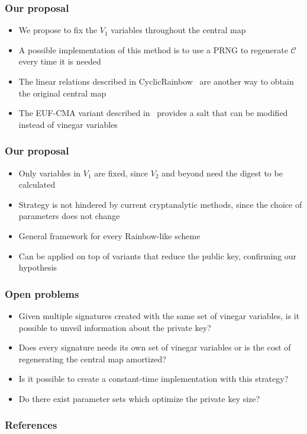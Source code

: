 \documentclass[12pt]{beamer}
\newcommand{\backupbegin}{
  \newcounter{framenumberappendix}
  \setcounter{framenumberappendix}{\value{framenumber}}
}
\newcommand{\backupend}{
  \addtocounter{framenumberappendix}{-\value{framenumber}}
  \addtocounter{framenumber}{\value{framenumberappendix}}
}
\begin{document}
\begin{frame}
  \frametitle{Our proposal}
  \begin{itemize}
    \item We propose to fix the $V_{1}$ variables throughout the central map
    \item A possible implementation of this method is to use a PRNG to
        regenerate $\mathcal{C}$ every time it is needed
    \item The linear relations described in
        CyclicRainbow~\cite{Petzoldt:inproc:2010:dec} are another way to obtain
        the original central map
    \item The EUF-CMA variant described in~\cite{Ding:misc:2017:dec} provides
        a salt that can be modified instead of vinegar variables
  \end{itemize}
\end{frame}

\begin{frame}
  \frametitle{Our proposal}
  \begin{itemize}
    \item Only variables in $V_{1}$ are fixed, since $V_{2}$ and beyond need
        the digest to be calculated
    \item Strategy is not hindered by current cryptanalytic methods, since the
        choice of parameters does not change
    \item General framework for every Rainbow-like scheme
    \item Can be applied on top of variants that reduce the public key,
        confirming our hypothesis
  \end{itemize}
\end{frame}

\begin{frame}
  \frametitle{Open problems}
  \begin{itemize}
    \item Given multiple signatures created with the same set of vinegar
        variables, is it possible to unveil information about the private key?
    \item Does every signature needs its own set of vinegar variables or is the
        cost of regenerating the central map amortized?
    \item Is it possible to create a constant-time implementation with this
        strategy?
    \item Do there exist parameter sets which optimize the private key size?
  \end{itemize}
\end{frame}

\backupbegin{}
\begin{frame}
  \frametitle{References}
  
  {\scriptsize }
\end{frame}
\backupend{}
\end{document}
